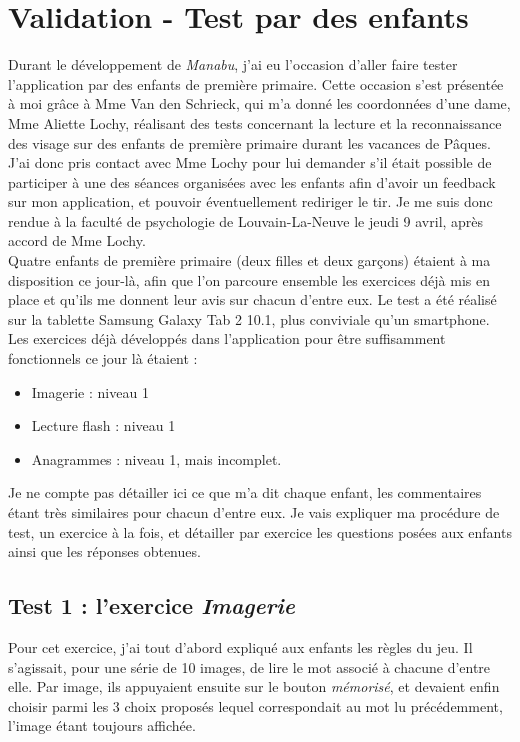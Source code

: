 \section{Validation - Test par des enfants \label{testEnfants}}
Durant le développement de \textit{Manabu}, j'ai eu l'occasion d'aller faire tester l'application par des enfants de première primaire. Cette occasion s'est présentée à moi grâce à Mme Van den Schrieck, qui m'a donné les coordonnées d'une dame, Mme Aliette Lochy, réalisant des tests concernant la lecture et la reconnaissance des visage sur des enfants de première primaire durant les vacances de Pâques. J'ai donc pris contact avec Mme Lochy pour lui demander s'il était possible de participer à une des séances organisées avec les enfants afin d'avoir un feedback sur mon application, et pouvoir éventuellement rediriger le tir. Je me suis donc rendue à la faculté de psychologie de Louvain-La-Neuve le jeudi 9 avril, après accord de Mme Lochy.\\

Quatre enfants de première primaire (deux filles et deux garçons) étaient à ma disposition ce jour-là, afin que l'on parcoure ensemble les exercices déjà mis en place et qu'ils me donnent leur avis sur chacun d'entre eux. Le test a été réalisé sur la tablette Samsung Galaxy Tab 2 10.1, plus conviviale qu'un smartphone. Les exercices déjà développés dans l'application pour être suffisamment fonctionnels ce jour là étaient :
\begin{itemize}
\item Imagerie : niveau 1
\item Lecture flash : niveau 1
\item Anagrammes : niveau 1, mais incomplet.
\end{itemize}
Je ne compte pas détailler ici ce que m'a dit chaque enfant, les commentaires étant très similaires pour chacun d'entre eux. Je vais expliquer ma procédure de test, un exercice à la fois, et détailler par exercice les questions posées aux enfants ainsi que les réponses obtenues.

\subsection{Test 1 : l'exercice \textit{Imagerie}}
Pour cet exercice, j'ai tout d'abord expliqué aux enfants les règles du jeu. Il s'agissait, pour une série de 10 images, de lire le mot associé à chacune d'entre elle. Par image, ils appuyaient ensuite sur le bouton \textit{mémorisé}, et devaient enfin choisir parmi les 3 choix proposés lequel correspondait au mot lu précédemment, l'image étant toujours affichée.\\

